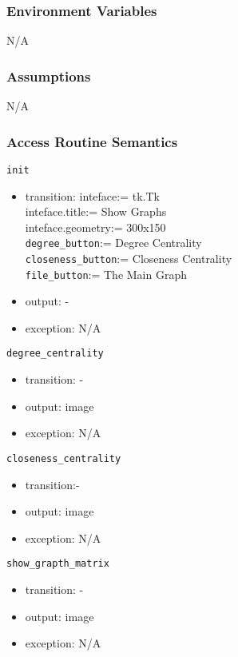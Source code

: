 \documentclass[12pt, titlepage]{article}
\begin{document}
\subsubsection{Environment Variables}

N/A

\subsubsection{Assumptions}

N/A

\subsubsection{Access Routine Semantics}

\noindent \texttt{init}
\begin{itemize}
\item transition: 
inteface:= tk.Tk\\
inteface.title:= Show Graphs\\
inteface.geometry:= 300x150\\
\texttt{degree\_button}:= Degree Centrality\\
\texttt{closeness\_button}:= Closeness Centrality\\
\texttt{file\_button}:= The Main Graph\\

\item output: -
\item exception: N/A  
\end{itemize}

\noindent \texttt{degree\_centrality}
\begin{itemize}
\item transition: -
\item output: image
\item exception: N/A  
\end{itemize}

\noindent \texttt{closeness\_centrality}
\begin{itemize}
\item transition:-
\item output: image
\item exception: N/A  
\end{itemize}

\noindent \texttt{show\_grapth\_matrix}
\begin{itemize}
\item transition: -
\item output: image
\item exception: N/A  
\end{itemize}
\end{document}
